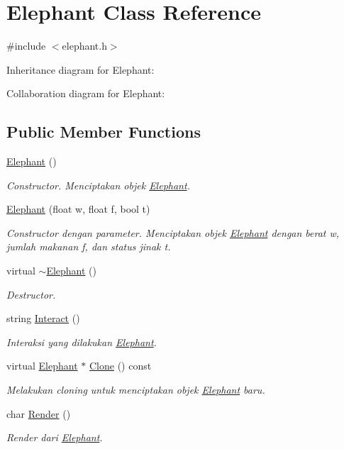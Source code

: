 \hypertarget{classElephant}{}\section{Elephant Class Reference}
\label{classElephant}


{\ttfamily \#include $<$elephant.\+h$>$}



Inheritance diagram for Elephant\+:


Collaboration diagram for Elephant\+:
\subsection*{Public Member Functions}
\begin{DoxyCompactItemize}
\item 
\hyperlink{classElephant_a372cc81064310f2f96db175b747647cb}{Elephant} ()
\begin{DoxyCompactList}\small\item\em Constructor. Menciptakan objek \hyperlink{classElephant}{Elephant}. \end{DoxyCompactList}\item 
\hyperlink{classElephant_a76bf83d1aacd5ff494532e14cf2a3bee}{Elephant} (float w, float f, bool t)
\begin{DoxyCompactList}\small\item\em Constructor dengan parameter. Menciptakan objek \hyperlink{classElephant}{Elephant} dengan berat w, jumlah makanan f, dan status jinak t. \end{DoxyCompactList}\item 
virtual \hyperlink{classElephant_aed5fb7142a24a101330af52652909075}{$\sim$\+Elephant} ()
\begin{DoxyCompactList}\small\item\em Destructor. \end{DoxyCompactList}\item 
string \hyperlink{classElephant_a4f2c4bef5ec886019ee88ad575f94fa7}{Interact} ()
\begin{DoxyCompactList}\small\item\em Interaksi yang dilakukan \hyperlink{classElephant}{Elephant}. \end{DoxyCompactList}\item 
virtual \hyperlink{classElephant}{Elephant} $\ast$ \hyperlink{classElephant_a723a7c90f44a95d9886163e605aecea7}{Clone} () const 
\begin{DoxyCompactList}\small\item\em Melakukan cloning untuk menciptakan objek \hyperlink{classElephant}{Elephant} baru. \end{DoxyCompactList}\item 
char \hyperlink{classElephant_a7e412f36e1f88cd278dea76d4f383e95}{Render} ()
\begin{DoxyCompactList}\small\item\em Render dari \hyperlink{classElephant}{Elephant}. \end{DoxyCompactList}\end{DoxyCompactItemize}
